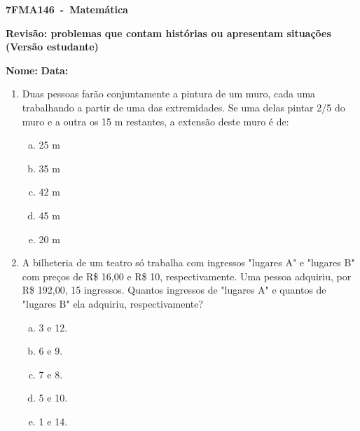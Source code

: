 \documentclass[a4paper,14pt]{article}
\begin{document}
	
	\noindent\textbf{7FMA146~-~Matemática} 
	
	\begin{center}
		\textbf{Revisão: problemas que contam histórias ou apresentam situações (Versão estudante)}
	\end{center}
	
	
	\noindent\textbf{Nome:} \underline{\hspace{10cm}}
    \noindent\textbf{Data:} \underline{\hspace{4cm}}
	
	
	\begin{multicols}{2}
	\begin{enumerate}	
		\item Duas pessoas farão conjuntamente a pintura de um muro, cada uma trabalhando a partir de uma das extremidades. Se uma delas pintar 2/5 do muro e a outra os 15 m restantes, a extensão deste muro é de: 
		\begin{enumerate}[a)]
			\item 25 m
			\item 35 m
			\item 42 m
			\item 45 m
			\item 20 m
	    \end{enumerate}
        \vspace{12cm}
        \item A bilheteria de um teatro só trabalha com ingressos "lugares A" e "lugares B" com preços de R\$ 16,00 e R\$ 10, respectivamente. Uma pessoa adquiriu, por R\$ 192,00, 15 ingressos. Quantos ingressos de "lugares A" e quantos de "lugares B" ela adquiriu, respectivamente?
        \begin{enumerate}[a)]
        	\item 3 e 12.
        	\item 6 e 9.
        	\item 7 e 8.
        	\item 5 e 10.
        	\item 1 e 14.
        	\\\\\\\\\\\\\\\\\\\\\\\\\\\\\\\\\\\\
        \end{enumerate}


\end{enumerate}
\end{multicols}
\end{document}
